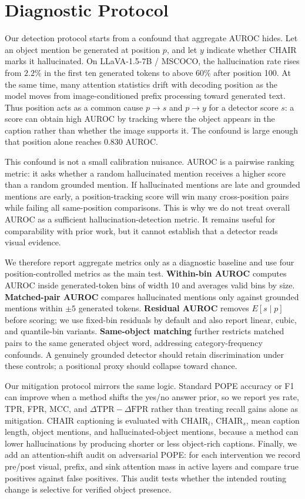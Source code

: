 \section{Diagnostic Protocol}
\label{sec:protocol}

Our detection protocol starts from a confound that aggregate AUROC hides. Let an object mention be generated at position $p$, and let $y$ indicate whether CHAIR marks it hallucinated. On LLaVA-1.5-7B / MSCOCO, the hallucination rate rises from $2.2\%$ in the first ten generated tokens to above $60\%$ after position 100. At the same time, many attention statistics drift with decoding position as the model moves from image-conditioned prefix processing toward generated text. Thus position acts as a common cause $p\rightarrow s$ and $p\rightarrow y$ for a detector score $s$: a score can obtain high AUROC by tracking where the object appears in the caption rather than whether the image supports it. The confound is large enough that position alone reaches $0.830$ AUROC.

This confound is not a small calibration nuisance. AUROC is a pairwise ranking metric: it asks whether a random hallucinated mention receives a higher score than a random grounded mention. If hallucinated mentions are late and grounded mentions are early, a position-tracking score will win many cross-position pairs while failing all same-position comparisons. This is why we do not treat overall AUROC as a sufficient hallucination-detection metric. It remains useful for comparability with prior work, but it cannot establish that a detector reads visual evidence.

We therefore report aggregate metrics only as a diagnostic baseline and use four position-controlled metrics as the main test. \textbf{Within-bin AUROC} computes AUROC inside generated-token bins of width 10 and averages valid bins by size. \textbf{Matched-pair AUROC} compares hallucinated mentions only against grounded mentions within $\pm5$ generated tokens. \textbf{Residual AUROC} removes $E[s\mid p]$ before scoring; we use fixed-bin residuals by default and also report linear, cubic, and quantile-bin variants. \textbf{Same-object matching} further restricts matched pairs to the same generated object word, addressing category-frequency confounds. A genuinely grounded detector should retain discrimination under these controls; a positional proxy should collapse toward chance.

Our mitigation protocol mirrors the same logic. Standard POPE accuracy or F1 can improve when a method shifts the yes/no answer prior, so we report yes rate, TPR, FPR, MCC, and $\Delta\mathrm{TPR}-\Delta\mathrm{FPR}$ rather than treating recall gains alone as mitigation. CHAIR captioning is evaluated with CHAIR$_i$, CHAIR$_s$, mean caption length, object mentions, and hallucinated-object mentions, because a method can lower hallucinations by producing shorter or less object-rich captions. Finally, we add an attention-shift audit on adversarial POPE: for each intervention we record pre/post visual, prefix, and sink attention mass in active layers and compare true positives against false positives. This audit tests whether the intended routing change is selective for verified object presence.

